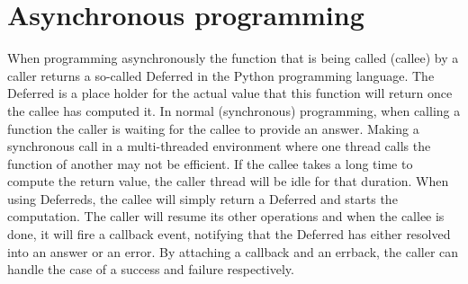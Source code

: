 
\section{Asynchronous programming}
\label{sec:async-programming}

When programming asynchronously the function that is being called (callee) by a caller returns a so-called Deferred in the Python programming language.
The Deferred is a place holder for the actual value that this function will return once the callee has computed it.
In normal (synchronous) programming, when calling a function the caller is waiting for the callee to provide an answer. 
Making a synchronous call in a multi-threaded environment where one thread calls the function of another may not be efficient.
If the callee takes a long time to compute the return value, the caller thread will be idle for that duration.
When using Deferreds, the callee will simply return a Deferred and starts the computation.
The caller will resume its other operations and when the callee is done, it will fire a callback event, notifying that the Deferred has either resolved into an answer or an error.
By attaching a callback and an errback, the caller can handle the case of a success and failure respectively.\\


